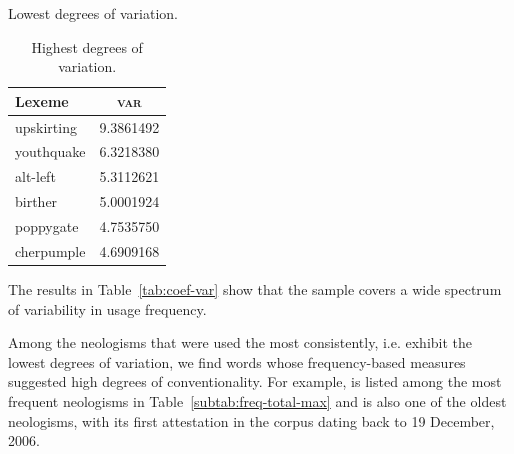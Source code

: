 \documentclass[
  a4paper,
  abstract=on,
  captions=tableabove
  ]{scrartcl}
\begin{document}
\begin{table}
\begin{subtable}[t]{.3\linewidth}
          \caption{Lowest degrees of variation.}
          \label{subtab:coef-var-lowest}
        \end{subtable}
        \hfill
        \begin{subtable}[t]{.3\linewidth}
          \begin{tabular}{
              l
              S[table-format=1.2, round-mode=places, round-precision=2]
            }
            \toprule
            Lexeme      & \textsc{var} \\
            \midrule
            upskirting    & 9.3861492 \\
            youthquake    & 6.3218380 \\
            alt-left      & 5.3112621 \\
            birther       & 5.0001924 \\
            poppygate     & 4.7535750 \\
            cherpumple    & 4.6909168 \\
            \bottomrule
          \end{tabular}
          \caption{Highest degrees of variation.}
          \label{subtab:coef-highest}
        \end{subtable}
      \end{table}

      The results in Table~\ref{tab:coef-var} show that the sample covers a wide spectrum of variability in usage frequency.

      Among the neologisms that were used the most consistently, i.e. exhibit the lowest degrees of variation, we find words whose frequency-based measures suggested high degrees of conventionality. For example,  is listed among the most frequent neologisms in Table~\ref{subtab:freq-total-max} and is also one of the oldest neologisms, with its first attestation in the corpus dating back to 19 December, 2006.
\end{document}
